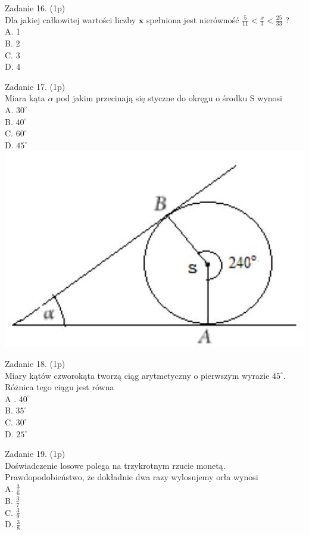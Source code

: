 \documentclass[10pt]{article}
\begin{document}
Zadanie 16. (1p)\\
Dla jakiej całkowitej wartości liczby \(\boldsymbol{x}\) spełniona jest nierówność \(\frac{5}{11}<\frac{x}{3}<\frac{25}{33}\) ?\\
A. 1\\
B. 2\\
C. 3\\
D. 4

Zadanie 17. (1p)\\
Miara kąta \(\alpha\) pod jakim przecinają się styczne do okręgu o środku S wynosi\\
A. \(30^{\circ}\)\\
B. \(40^{\circ}\)\\
C. \(60^{\circ}\)\\
D. \(45^{\circ}\)\\
\includegraphics[max width=\textwidth, center]{2024_11_21_9d761ca624f0efee99a4g-06(1)}

Zadanie 18. (1p)\\
Miary kątów czworokąta tworzą ciąg arytmetyczny o pierwszym wyrazie \(45^{\circ}\). Różnica tego ciągu jest równa\\
A . \(40^{\circ}\)\\
B. \(35^{\circ}\)\\
C. \(30^{\circ}\)\\
D. \(25^{\circ}\)

Zadanie 19. (1p)\\
Doświadczenie losowe polega na trzykrotnym rzucie monetą. Prawdopodobieństwo, że dokładnie dwa razy wylosujemy orła wynosi\\
A. \(\frac{3}{6}\)\\
B. \(\frac{3}{7}\)\\
C. \(\frac{3}{9}\)\\
D. \(\frac{3}{8}\)
\end{document}
